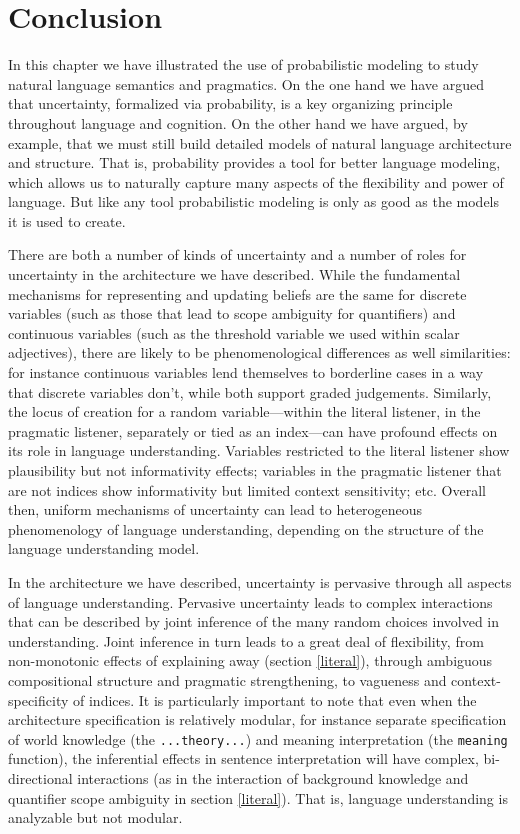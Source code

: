 \documentclass[pdfextras]{handbook}
\begin{document}
\section{Conclusion}

In this chapter we have illustrated the use of probabilistic modeling to study natural language semantics and pragmatics. On the one hand we have argued that uncertainty, formalized via probability, is a key organizing principle throughout language and cognition. On the other hand we have argued, by example, that we must still build detailed models of natural language architecture and structure. That is, probability provides a tool for better language modeling, which allows us to naturally capture many aspects of the flexibility and power of language. But like any tool probabilistic modeling is only as good as the models it is used to create.

There are both a number of kinds of uncertainty and a number of roles for uncertainty in the architecture we have described.
While the fundamental mechanisms for representing and updating beliefs are the same for discrete variables (such as those that lead to scope ambiguity for quantifiers) and continuous variables (such as the threshold variable we used within scalar adjectives), there are likely to be phenomenological differences as well similarities: for instance continuous variables lend themselves to borderline cases in a way that discrete variables don't, while both support graded judgements. Similarly, the locus of creation for a random variable---within the literal listener, in the pragmatic listener, separately or tied as an index---can have profound effects on its role in language understanding. Variables restricted to the literal listener show plausibility but not informativity effects; variables in the pragmatic listener that are not indices show informativity but limited context sensitivity; etc. Overall then, uniform mechanisms of uncertainty can lead to heterogeneous phenomenology of language understanding, depending on the structure of the language understanding model. 

In the architecture we have described, uncertainty is pervasive through all aspects of language understanding. Pervasive uncertainty leads to complex interactions that can be described by joint inference of the many random choices involved in understanding. Joint inference in turn leads to a great deal of flexibility, from non-monotonic effects of explaining away (section \ref{literal}), through ambiguous compositional structure and pragmatic strengthening, to vagueness and context-specificity of indices. It is particularly important to note that even when the architecture specification is relatively modular, for instance separate specification of world knowledge (the \lstinline{...theory...}) and meaning interpretation (the \lstinline{meaning} function), the inferential effects in sentence interpretation will have complex, bi-directional interactions (as in the interaction of background knowledge and quantifier scope ambiguity in section \ref{literal}). That is, language understanding is analyzable but not modular.
\end{document}
